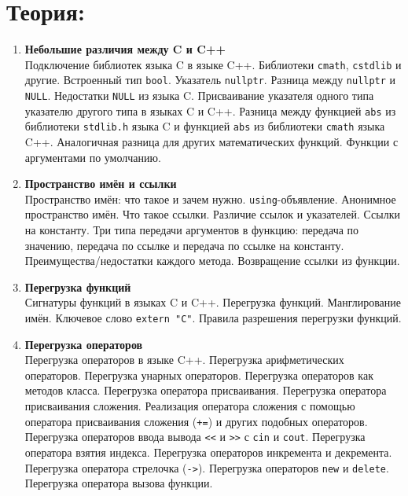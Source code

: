 \documentclass{article}
\begin{document}

\section*{Теория:}
\begin{enumerate}

\item \textbf{Небольшие различия между C и C++}\\
Подключение библиотек языка C в языке C++. Библиотеки \texttt{cmath}, \texttt{cstdlib} и другие. Встроенный тип \texttt{bool}. Указатель \texttt{nullptr}. Разница между \texttt{nullptr} и \texttt{NULL}. Недостатки \texttt{NULL} из языка C. Присваивание указателя одного типа указателю другого типа в языках C и C++. Разница между функцией \texttt{abs} из библиотеки \texttt{stdlib.h} языка C и функцией \texttt{abs} из библиотеки \texttt{cmath} языка C++. Аналогичная разница для других математических функций. Функции с аргументами по умолчанию.

\item \textbf{Пространство имён и ссылки}\\
Пространство имён: что такое и зачем нужно. \texttt{using}-объявление. Анонимное пространство имён. Что такое ссылки. Различие ссылок и указателей. Ссылки на константу. Три типа передачи аргументов в функцию: передача по значению, передача по ссылке и передача по ссылке на константу. Преимущества/недостатки каждого метода. Возвращение ссылки из функции.   



\item  \textbf{Перегрузка функций}\\
Сигнатуры функций в языках C и C++. Перегрузка функций. Манглирование имён. Ключевое слово \texttt{extern "C"}. Правила разрешения перегрузки функций. 


\item \textbf{Перегрузка операторов}\\
Перегрузка операторов в языке C++. Перегрузка арифметических операторов. Перегрузка унарных операторов. Перегрузка операторов как методов класса. Перегрузка оператора присваивания. Перегрузка оператора присваивания сложения. Реализация оператора сложения с помощью оператора присваивания сложения (\texttt{+=}) и других подобных операторов. Перегрузка операторов ввода вывода \verb|<<| и \verb|>>| с \texttt{cin} и \texttt{cout}. Перегрузка оператора взятия индекса. Перегрузка операторов инкремента и декремента. Перегрузка оператора стрелочка (\texttt{->}). Перегрузка операторов \texttt{new} и \texttt{delete}. Перегрузка оператора вызова функции.


\end{enumerate}
\end{document}

